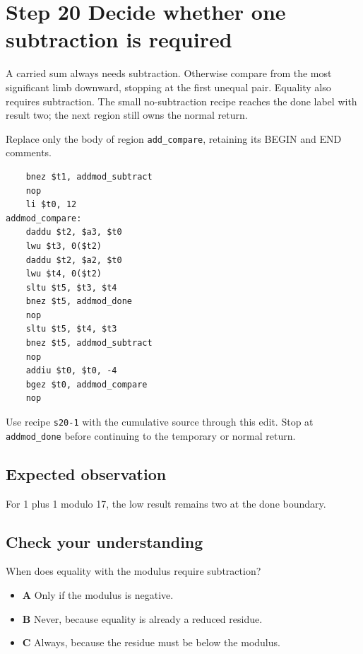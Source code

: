 \section{Step 20 Decide whether one subtraction is required}\label{rsa-s20}

A carried sum always needs subtraction. Otherwise compare from the most significant limb downward, stopping at the first unequal pair. Equality also requires subtraction. The small no-subtraction recipe reaches the done label with result two; the next region still owns the normal return.

Replace only the body of region \texttt{add\_compare}, retaining its BEGIN and END comments.

\begin{verbatim}
    bnez $t1, addmod_subtract
    nop
    li $t0, 12
addmod_compare:
    daddu $t2, $a3, $t0
    lwu $t3, 0($t2)
    daddu $t2, $a2, $t0
    lwu $t4, 0($t2)
    sltu $t5, $t3, $t4
    bnez $t5, addmod_done
    nop
    sltu $t5, $t4, $t3
    bnez $t5, addmod_subtract
    nop
    addiu $t0, $t0, -4
    bgez $t0, addmod_compare
    nop
\end{verbatim}

Use recipe \texttt{s20-1} with the cumulative source through this edit. Stop at \texttt{addmod\_done} before continuing to the temporary or normal return.

\subsection{Expected observation}
For 1 plus 1 modulo 17, the low result remains two at the done boundary.

\subsection{Check your understanding}
When does equality with the modulus require subtraction?

\begin{itemize}
\item \textbf{A} Only if the modulus is negative.
\item \textbf{B} Never, because equality is already a reduced residue.
\item \textbf{C} Always, because the residue must be below the modulus.
\end{itemize}
